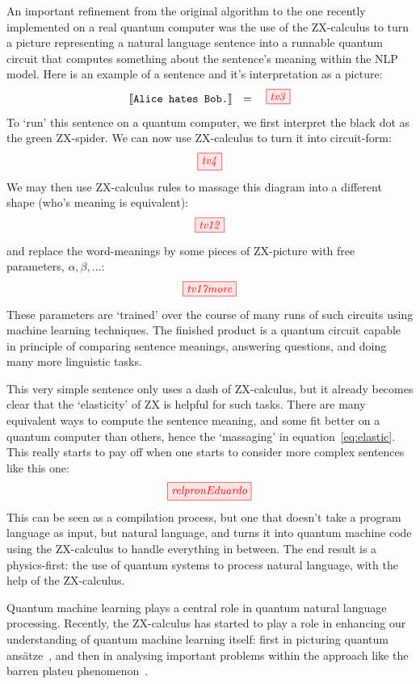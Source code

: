 \documentclass[11pt]{article}
\theoremstyle{definition}
\begin{document}
{An important refinement from the original algorithm to the one recently implemented on a real quantum computer was the use of the ZX-calculus to turn a picture representing a natural language sentence into a runnable quantum circuit that computes something about the sentence's meaning within the NLP model. Here is an example of a sentence and it's interpretation as a picture:
\[
\llbracket \textrm{{\tt Alice hates Bob.}} \rrbracket \ \ =\ \ \ 
\tikzfig{tv3}  
\]
To `run' this sentence on a quantum computer, we first interpret the black dot as the green ZX-spider.  We can now use ZX-calculus to turn it into circuit-form:  
\[
\tikzfig{tv4}
\]
We may then use ZX-calculus rules to massage this diagram into a different shape (who's meaning is equivalent):  
\begin{equation}\label{eq:elastic}
\tikzfig{tv12}
\end{equation}
and replace the word-meanings by some pieces of ZX-picture with free parameters, $\alpha, \beta, ...$:
\[
\tikzfig{tv17more}
\]
These parameters are `trained' over the course of many runs of such circuits using machine learning techniques. The finished product is a quantum circuit capable in principle of comparing sentence meanings, answering questions, and doing many more linguistic tasks.

This very simple sentence only uses a dash of ZX-calculus, but it already becomes clear that the `elasticity' of ZX is helpful for such tasks. There are many equivalent ways to compute the sentence meaning, and some fit better on a quantum computer than others, hence the `massaging' in equation~\eqref{eq:elastic}. This really starts to pay off when one starts to consider more complex sentences like this one:
\[
\tikzfig{relpronEduardo} 
\]
This can be seen as a compilation process, but one that doesn't take a program language as input, but natural language, and turns it into quantum machine code using the ZX-calculus to handle everything in between. The end result is a physics-first: the use of quantum systems to process natural language, with the help of the ZX-calculus.

Quantum machine learning plays a central role in quantum natural language processing. Recently, the ZX-calculus has started to play a role in enhancing our understanding of quantum machine learning itself: first in picturing quantum ans\"atze~\cite{yeung2020diagrammatic}, and then in analysing important problems within the approach like the barren plateu phenomenon~\cite{zhao2021analyzing}.

}
\end{document}
